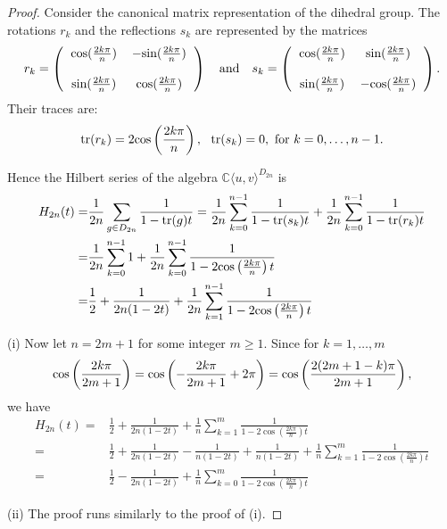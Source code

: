 \documentclass{amsart}[12pt]
\theoremstyle{definition}
\newcommand{\CuvD}{{\mathbb C}\langle u,v\rangle^{D_{2n}}}
\begin{document}
\begin{proof}
	Consider the canonical matrix representation of the dihedral group. The rotations $r_k$ and the reflections $s_k$ are represented by the matrices
	\[
	r_k=\left(\begin{tabular}{  c  c  }
		$\text{\rm cos}(\frac{2k\pi}{n})$& $-\text{\rm sin}(\frac{2k\pi}{n})$ \\
		&\\
		$\text{\rm sin}(\frac{2k\pi}{n})$ &$\text{\rm cos}(\frac{2k\pi}{n})$\\
	\end{tabular}\right) \ \ \ \text{\rm and} \ \ \
	s_k=\left(\begin{tabular}{  c  c  }
		$\text{\rm cos}(\frac{2k\pi}{n})$& $\text{\rm sin}(\frac{2k\pi}{n})$ \\
		&\\
		$\text{\rm sin}(\frac{2k\pi}{n})$ & $-\text{\rm cos}(\frac{2k\pi}{n})$\\
	\end{tabular}\right).
	\]
Their traces are:
\[
\text{\rm tr}(r_k)=2\text{\rm cos}\left(\frac{2k\pi}{n}\right), \ \   \text{\rm tr}(s_k)=0, \text{ for } k=0,\ldots,n-1.
\]

Hence the Hilbert series of the algebra $\CuvD$ is
\begin{align}
H_{2n}(t)=&\frac{1}{2n}\sum_{g\in D_{2n}}\frac{1}{1-\text{\rm tr}(g)t}\nonumber
		=\frac{1}{2n}\sum_{k=0}^{n-1}\frac{1}{1-\text{\rm tr}(s_k)t}+\frac{1}{2n}\sum_{k=0}^{n-1}\frac{1}{1-\text{\rm tr}(r_k)t}\nonumber\\
		=&\frac{1}{2n}\sum_{k=0}^{n-1}{1}+\frac{1}{2n}\sum_{k=0}^{n-1}\frac{1}{1-2\text{\rm cos}\left(\frac{2k\pi}{n}\right)t}\nonumber\\
		=&\frac{1}{2}+\frac{1}{2n(1-2t)}+\frac{1}{2n}\sum_{k=1}^{n-1}\frac{1}{1-2\text{\rm cos}\left(\frac{2k\pi}{n}\right)t}\nonumber
	\end{align}
	
	(i) Now let $n=2m+1$ for some integer $m\geq1$. Since for $k=1,\ldots,m$
	\[
	\text{\rm cos}\left(\frac{2k\pi}{2m+1}\right)=\text{\rm cos}\left(-\frac{2k\pi}{2m+1}+2\pi\right)=\text{\rm cos}\left(\frac{2(2m+1-k)\pi}{2m+1}\right),
	\]
	we have
\begin{align*}
	H_{2n}(t)=& \frac{1}{2} + \frac{1}{2n(1-2t)}  +\frac{1}{n}\sum_{k=1}^{m}\frac{1}{1-2\cos(\frac{2k\pi}{n})t}	\\
	= & \frac{1}{2} + \frac{1}{2n(1-2t)} -  \frac{1}{n(1-2t)} +  \frac{1}{n(1-2t)} + \frac{1}{n}\sum_{k=1}^{m}\frac{1}{1-2\cos(\frac{2k\pi}{n})t}\\
	= &  \frac{1}{2} - \frac{1}{2n(1-2t)}  + \frac{1}{n}\sum_{k=0}^{m}\frac{1}{1-2\cos(\frac{2k\pi}{n})t}
\end{align*}	
			
	(ii) The proof runs similarly to the proof of (i).
\end{proof}
\end{document}
